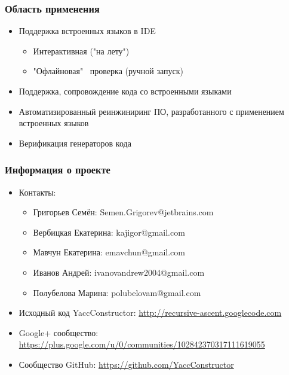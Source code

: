 \documentclass{beamer}
\begin{document}
\begin{frame}
	\transwipe[direction=90]
	\frametitle{Область применения}
	\begin{itemize}
		\item Поддержка встроенных языков в IDE
    	\begin{itemize}
            \item Интерактивная ("на лету")
            \item "Офлайновая" \ проверка (ручной запуск)
        \end{itemize}
        \item Поддержка, сопровождение кода со встроенными языками
		\item Автоматизированный реинжиниринг ПО, разработанного с применением встроенных языков
		\item Верификация генераторов кода
	\end{itemize}
\end{frame}

\begin{frame}
	\transwipe[direction=90]
	\frametitle{Информация о проекте}
	\begin{itemize}
		\item Контакты: 
        \begin{itemize}
            \item Григорьев Семён: Semen.Grigorev@jetbrains.com
            \item Вербицкая Екатерина: kajigor@gmail.com
            \item Мавчун Екатерина: emavchun@gmail.com
            \item Иванов Андрей: ivanovandrew2004@gmail.com
            \item Полубелова Марина: polubelovam@gmail.com
        \end{itemize}
		\item Исходный код YaccConstructor: \href{http://recursive-ascent.googlecode.com}{http://recursive-ascent.googlecode.com}
		\item Google+ сообщество: \href{https://plus.google.com/u/0/communities/102842370317111619055}{https://plus.google.com/u/0/communities/102842370317111619055}
		\item Сообщество GitHub: \href{https://github.com/YaccConstructor}{https://github.com/YaccConstructor}
	\end{itemize}
\end{frame}
\end{document}
